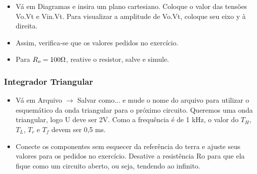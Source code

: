 
\begin{itemize}
    \item Vá em Diagramas e insira um plano cartesiano.
    Coloque o valor das tensões Vo.Vt e Vin.Vt. Para
    visualizar a amplitude de Vo.Vt, coloque seu eixo y à
    direita.
\end{itemize}


\begin{itemize}
    \item Assim, verifica-se que os valores pedidos no exercício.
\end{itemize}


\begin{itemize}
    \item Para $R_o=100\ohm$, reative o resistor, salve e simule.
\end{itemize}


\subsubsection{Integrador Triangular}

\begin{itemize}
    \item Vá em Arquivo $\rightarrow$ Salvar como... e mude o nome do
    arquivo para utilizar o esquemático da onda
    triangular para o próximo circuito. Queremos uma
    onda triangular, logo U deve ser 2V. Como a
    frequência é de 1 kHz, o valor do $T_H$, $T_L$, $T_r$ e $T_f$ devem
    ser 0,5 ms.
\end{itemize}


\begin{itemize}
    \item Conecte os componentes sem esquecer da
    referência do terra e ajuste seus valores para os
    pedidos no exercício. Desative a resistência Ro para
    que ela fique como um circuito aberto, ou seja,
    tendendo ao infinito.
\end{itemize}

